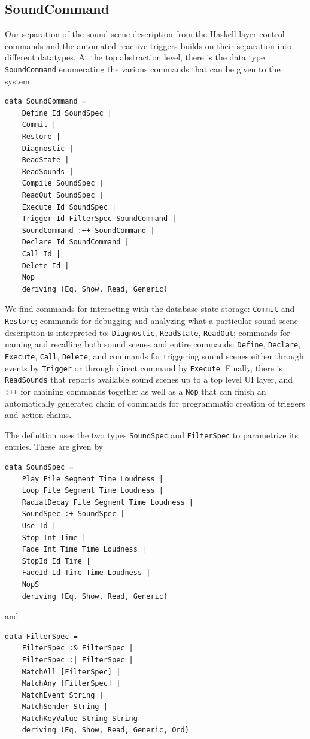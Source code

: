 \subsection{SoundCommand}
\label{sec:soundspec}

Our separation of the sound scene description from the Haskell layer
control commands and the automated reactive triggers builds on their
separation into different datatypes. At the top abstraction
level, there is the data type \texttt{SoundCommand} enumerating the
various commands that can be given to the system. 

\begin{verbatim}
data SoundCommand = 
    Define Id SoundSpec |
    Commit | 
    Restore | 
    Diagnostic |
    ReadState |
    ReadSounds | 
    Compile SoundSpec |
    ReadOut SoundSpec | 
    Execute Id SoundSpec |
    Trigger Id FilterSpec SoundCommand |
    SoundCommand :++ SoundCommand |
    Declare Id SoundCommand |
    Call Id | 
    Delete Id | 
    Nop
    deriving (Eq, Show, Read, Generic)
\end{verbatim}

We find commands for interacting with the database state storage:
\texttt{Commit} and \texttt{Restore}; commands for debugging and
analyzing what a particular sound scene description is interpreted to:
\texttt{Diagnostic}, \texttt{ReadState}, \texttt{ReadOut}; commands
for naming and recalling both sound scenes and entire commands:
\texttt{Define}, \texttt{Declare}, \texttt{Execute}, \texttt{Call},
\texttt{Delete}; and commands for triggering sound scenes either
through events by \texttt{Trigger} or through direct command by
\texttt{Execute}. Finally, there is \texttt{ReadSounds} that reports
available sound scenes up to a top level UI layer, and
\texttt{:++} for chaining commands together as well as a \texttt{Nop}
that can finish an automatically generated chain of commands for
programmatic creation of triggers and action chains. 

The definition uses the two types \texttt{SoundSpec} and
\texttt{FilterSpec} to parametrize its entries. These are given by

\begin{verbatim}
data SoundSpec = 
    Play File Segment Time Loudness |
    Loop File Segment Time Loudness |
    RadialDecay File Segment Time Loudness | 
    SoundSpec :+ SoundSpec | 
    Use Id |
    Stop Int Time |
    Fade Int Time Time Loudness |
    StopId Id Time |
    FadeId Id Time Time Loudness |
    NopS
    deriving (Eq, Show, Read, Generic)
\end{verbatim}
and
\begin{verbatim}
data FilterSpec = 
    FilterSpec :& FilterSpec |
    FilterSpec :| FilterSpec |
    MatchAll [FilterSpec] |
    MatchAny [FilterSpec] |
    MatchEvent String |
    MatchSender String |
    MatchKeyValue String String
    deriving (Eq, Show, Read, Generic, Ord)
\end{verbatim}

